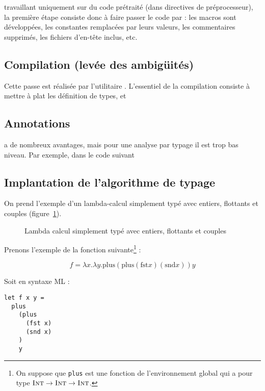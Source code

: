 \ctonewspeak{} travaillant uniquement sur du code prétraité (dans directives de
préprocesseur), la première étape consiste donc à faire passer le code par \cpp:
les macros sont développées, les constantes remplacées par leurs valeurs, les
commentaires supprimés, les fichiers d'en-tête inclus, etc.

\subsection{Compilation (levée des ambigüités)}

Cette passe est réalisée par l'utilitaire \ctonewspeak{}. L'essentiel de la
compilation consiste à mettre à plat les définition de types, et \subsection{Annotations}

\newspeak{} a de nombreux avantages, mais pour une analyse par typage il est
trop bas niveau. Par exemple, dans le code suivant



\wip{}

\subsection{Implantation de l'algorithme de typage}

On prend l'exemple d'un lambda-calcul simplement typé avec entiers, flottants et
couples (figure~\ref{fig:stlc}).

\begin{figure}



\caption{Lambda calcul simplement typé avec entiers, flottants et couples}
\label{fig:stlc}

\end{figure}

Prenons l'exemple de la fonction suivante\footnote{ On suppose que \texttt{plus}
est une fonction de l'environnement global qui a pour type $\textsc{Int} \rightarrow
\textsc{Int} \rightarrow \textsc{Int}$.} :

\[
f = λx.λy. \textrm{plus} (\textrm{plus} (\textrm{fst} x) (\textrm{snd} x)) y
\]

Soit en syntaxe ML :

\begin{Verbatim}
let f x y =
  plus
    (plus
      (fst x)
      (snd x)
    )
    y
\end{Verbatim}

